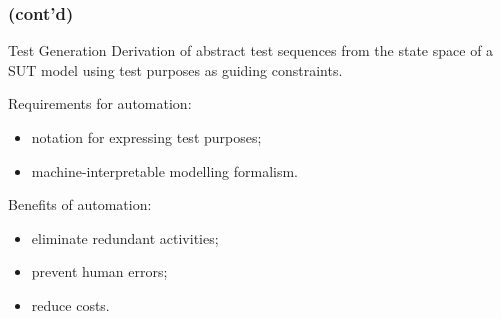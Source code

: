 \documentclass{beamer}
\newcommand{\recallframetitle}{}
\newcommand{\frametitlecont}{%
    \frametitle{\recallframetitle{} (cont'd)}%
}
\newcommand{\pauseafteritemize}{\pause[\thebeamerpauses]}
\newenvironment{definitionboxnopause}[1][]
    {\begin{block}{#1}}
    {\end{block}}
\begin{document}

    \begin{frame}
        \frametitlecont{}
        \begin{definitionboxnopause}[Test Generation]
            Derivation of abstract test sequences from the state space of a SUT model using test purposes as guiding constraints.
        \end{definitionboxnopause}
        \pause
        \bigskip
        \par Requirements for automation:
        \pause
        \begin{itemize}[<+->]
            \item notation for expressing test purposes;
            \item machine-interpretable modelling formalism.
        \end{itemize}
        \pauseafteritemize
        \bigskip
        \par Benefits of automation:
        \pause
        \begin{itemize}[<+->]
            \item eliminate redundant activities;
            \item prevent human errors;
            \item reduce costs.
        \end{itemize}
    \end{frame}

\end{document}
